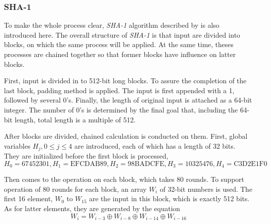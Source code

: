 \subsubsection{SHA-1}
To make the whole process clear, \emph{SHA-1} algorithm described by \cite{SHA} is also introduced here. 
The overall structure of \emph{SHA-1} is that input are divided into blocks, on which 
the same process will be applied. At the same time, theses processes are chained 
together so that former blocks have influence on latter blocks. 

First, input is divided in to 512-bit long blocks. 
To assure the completion of the last block, padding method is applied. 
The input is first appended with a 1, followed by several 0's. Finally, 
the length of original input is attached as a 64-bit integer. 
The number of 0's is determined by the final goal that, including the 64-bit length, 
total length is a multiple of 512. 

After blocks are divided, chained calculation is conducted on them. 
First, global variables $H_j, 0\le j\le 4$ are introduced, each of which has 
a length of 32 bits. 
They are initialized before the first block is processed, 
$$
H_0=\text{67452301}, 
H_1=\text{EFCDAB89}, 
H_2=\text{98BADCFE}, 
H_3=\text{10325476}, 
H_4=\text{C3D2E1F0}
$$

Then comes to the operation on each block, which takes 80 rounds.  
To support operation of 80 rounds for each block, an array $W_i$ of 32-bit 
numbers is used. 
The first 16 element, $W_0$ to $W_{15}$ are the input in this block, which is exactly 
512 bits. 
As for latter elements, they are generated by the equation 
$$
W_i=W_{i-3}\oplus W_{i-8}\oplus W_{i-14}\oplus W_{i-16}
$$


